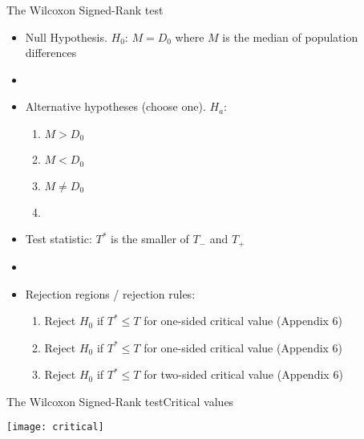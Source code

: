 \documentclass[xcolor=dvipsnames]{beamer}
\begin{document}
\begin{frame}{The Wilcoxon Signed-Rank test}
		\begin{itemize}
		\item Null Hypothesis. $H_0$: $M=D_0$ where $M$ is the median of population differences
		\item[]
		\item Alternative hypotheses (choose one). $H_a$:
		\begin{enumerate}
			\item $M > D_0$
			\item $M < D_0$
			\item $M \neq D_0$
			\item[]
		\end{enumerate}
		\item Test statistic: $T^*$ is the smaller of $T_-$ and $T_+$
		\item[]
		\item Rejection regions / rejection rules:
		\begin{enumerate}
			\item Reject $H_0$ if $T^* \leq T$ for one-sided critical value (Appendix 6)
			\item Reject $H_0$ if $T^* \leq T$ for one-sided critical value (Appendix 6)
			\item Reject $H_0$ if $T^* \leq T$ for two-sided critical value (Appendix 6)
		\end{enumerate}
	\end{itemize}
\end{frame}

\begin{frame}{The Wilcoxon Signed-Rank test}{Critical values}
	\begin{center}
		\texttt{[image: critical]}
	\end{center}
\end{frame}
\end{document}
